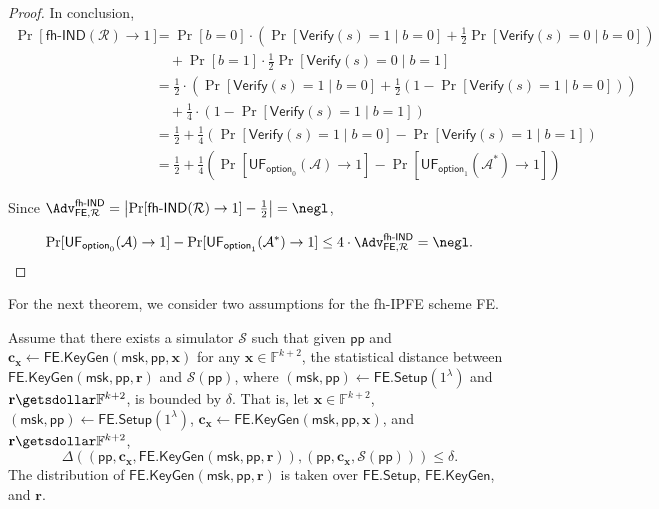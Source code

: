 \begin{proof}
In conclusion,
\begin{align*}
	\Pr[\textsf{fh-IND}(\mathcal{R}) \to 1]
	&= \Pr[b = 0] \cdot \left( \Pr[\textsf{Verify}(s) = 1 \mid b = 0] + \frac{1}{2} \Pr[\textsf{Verify}(s) = 0 \mid b = 0] \right)  \\
	&\quad + \Pr[b = 1] \cdot \frac{1}{2} \Pr[\textsf{Verify}(s) = 0 \mid b = 1] \\
	&= \frac{1}{2} \cdot \left ( \Pr[\textsf{Verify}(s) = 1 \mid b = 0] + \frac{1}{2} (1 - \Pr[\textsf{Verify}(s) = 1 \mid b = 0]) \right) \\
	& \quad +  \frac{1}{4} \cdot (1 - \Pr[\textsf{Verify}(s) = 1 \mid b = 1]) \\
	&= \frac{1}{2} + \frac{1}{4} \left( \Pr[\textsf{Verify}(s) = 1 \mid b = 0] - \Pr[\textsf{Verify}(s) = 1 \mid b = 1] \right) \\
	&= \frac{1}{2} + \frac{1}{4} \left( \Pr[\textsf{UF}_{\textsf{option}_0}(\mathcal{A}) \to 1] - \Pr[ \textsf{UF}_{\textsf{option}_1}(\mathcal{A}^*) \to 1 ] \right)
\end{align*}

\noindent Since $\Adv_{\textsf{FE}, \mathcal{R}}^\textsf{fh-IND} = \left| \Pr[\textsf{fh-IND}(\mathcal{R}) \to 1 ] - \frac{1}{2} \right| = \negl$,

\[
	\Pr[\textsf{UF}_{\textsf{option}_0}(\mathcal{A}) \to 1] - \Pr[ \textsf{UF}_{\textsf{option}_1}(\mathcal{A}^*) \to 1 ] \leq 4 \cdot \Adv_{\textsf{FE}, \mathcal{R}}^\textsf{fh-IND} = \negl.
\]

\end{proof}

For the next theorem, we consider two assumptions for the fh-IPFE scheme \textsf{FE}.

\begin{assumption}
\label{assump:ind-uf-lob:simulator}
	Assume that there exists a simulator $\mathcal{S}$ such that given $\textsf{pp}$ and $\mathbf{c_x} \gets \textsf{FE.KeyGen}(\textsf{msk}, \textsf{pp}, \mathbf{x})$ for any $\mathbf{x} \in \mathbb{F}^{k+2}$, the statistical distance between $\textsf{FE.KeyGen}(\textsf{msk}, \textsf{pp}, \mathbf{r})$ and $\mathcal{S}(\textsf{pp})$, where $(\textsf{msk}, \textsf{pp}) \gets \textsf{FE.Setup}(1^\lambda)$ and $\mathbf{r} \getsdollar \mathbb{F}^{k+2}$, is bounded by $\delta$.
	That is, let $\mathbf{x} \in \mathbb{F}^{k+2}$, $(\textsf{msk}, \textsf{pp}) \gets \textsf{FE.Setup}(1^\lambda)$, $\mathbf{c_x} \gets \textsf{FE.KeyGen}(\textsf{msk}, \textsf{pp}, \mathbf{x})$, and $\mathbf{r} \getsdollar \mathbb{F}^{k+2}$,
	\[
		\Delta \left( (\textsf{pp}, \mathbf{c_x}, \textsf{FE.KeyGen}(\textsf{msk}, \textsf{pp}, \mathbf{r})), (\textsf{pp}, \mathbf{c_x}, \mathcal{S}(\textsf{pp}) ) \right) \leq \delta.
	\]
	The distribution of $\textsf{FE.KeyGen}(\textsf{msk}, \textsf{pp}, \mathbf{r})$ is taken over $\textsf{FE.Setup}$, $\textsf{FE.KeyGen}$, and $\mathbf{r}$.

\end{assumption}


